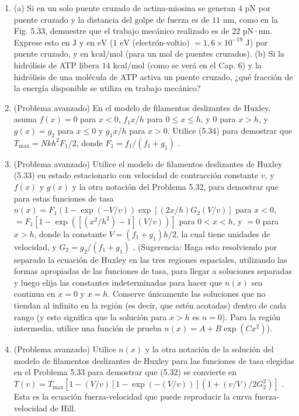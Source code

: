 \documentclass[12pt]{book}
\begin{document}
\begin{enumerate}
\item[5.31] (a) Si en un solo puente cruzado de actina-miosina se generan $4\text{ pN}$ por puente cruzado y la distancia del golpe de fuerza es de $11\text{ nm}$, como en la Fig. 5.33, demuestre que el trabajo mecánico realizado es de $22\text{ pN}\cdot\text{nm}$. Exprese esto en $\text{J}$ y en $\text{eV}$ ($1\text{ eV}$ (electrón-voltio) $= 1{,}6 \times 10^{-19}\text{ J}$) por puente cruzado, y en $\text{kcal/mol}$ (para un mol de puentes cruzados).
(b) Si la hidrólisis de ATP libera $14\text{ kcal/mol}$ (como se verá en el Cap. 6) y la hidrólisis de una molécula de ATP activa un puente cruzado, ¿qué fracción de la energía disponible se utiliza en trabajo mecánico?

\item[5.32] (Problema avanzado) En el modelo de filamentos deslizantes de Huxley, asuma $f(x) = 0$ para $x < 0$, $f_1 x/h$ para $0 \le x \le h$, y $0$ para $x > h$, y $g(x) = g_2$ para $x \le 0$ y $g_1 x/h$ para $x > 0$. Utilice (5.34) para demostrar que $T_{\text{max}} = Nkh^2 F_1/2$, donde $F_1 = f_1/(f_1 + g_1)$ \cite{41}.

\item[5.33] (Problema avanzado) Utilice el modelo de filamentos deslizantes de Huxley (5.33) en estado estacionario con velocidad de contracción constante $v$, y $f(x)$ y $g(x)$ y la otra notación del Problema 5.32, para demostrar que para estas funciones de tasa $n(x) = F_1(1 - \exp(-V/v)) \exp[(2x/h)G_2(V/v)]$ para $x < 0$, $= F_1[1 - \exp([(x^2/h^2) - 1](V/v))]$ para $0 < x < h$, y $= 0$ para $x > h$, donde la constante $V = (f_1 + g_1)h/2$, la cual tiene unidades de velocidad, y $G_2 = g_2/(f_1 + g_1)$ \cite{41}. (Sugerencia: Haga esto resolviendo por separado la ecuación de Huxley en las tres regiones espaciales, utilizando las formas apropiadas de las funciones de tasa, para llegar a soluciones separadas y luego elija las constantes indeterminadas para hacer que $n(x)$ sea continua en $x = 0$ y $x = h$. Conserve únicamente las soluciones que no tiendan al infinito en la región (es decir, que estén acotadas) dentro de cada rango (y esto significa que la solución para $x > h$ es $n = 0$). Para la región intermedia, utilice una función de prueba $n(x) = A + B \exp(C x^2)$).

\item[5.34] (Problema avanzado) Utilice $n(x)$ y la otra notación de la solución del modelo de filamentos deslizantes de Huxley para las funciones de tasa elegidas en el Problema 5.33 para demostrar que (5.32) se convierte en $T(v) = T_{\text{max}}[1 - (V/v)[1 - \exp(-(V/v))](1 + (v/V)/2G_2^2)]$ \cite{41}. Esta es la ecuación fuerza-velocidad que puede reproducir la curva fuerza-velocidad de Hill.


\end{enumerate}
\end{document}
